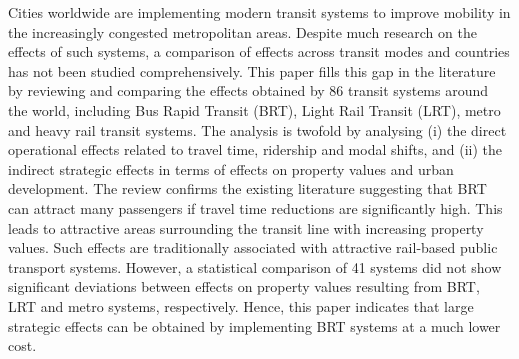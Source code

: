 Cities worldwide are implementing modern transit systems to improve mobility in the increasingly congested metropolitan areas. Despite much research on the effects of such systems, a comparison of effects across transit modes and countries has not been studied comprehensively. This paper fills this gap in the literature by reviewing and comparing the effects obtained by 86 transit systems around the world, including Bus Rapid Transit (BRT), Light Rail Transit (LRT), metro and heavy rail transit systems. The analysis is twofold by analysing (i) the direct operational effects related to travel time, ridership and modal shifts, and (ii) the indirect strategic effects in terms of effects on property values and urban development. The review confirms the existing literature suggesting that BRT can attract many passengers if travel time reductions are significantly high. This leads to attractive areas surrounding the transit line with increasing property values. Such effects are traditionally associated with attractive rail-based public transport systems. However, a statistical comparison of 41 systems did not show significant deviations between effects on property values resulting from BRT, LRT and metro systems, respectively. Hence, this paper indicates that large strategic effects can be obtained by implementing BRT systems at a much lower cost.
